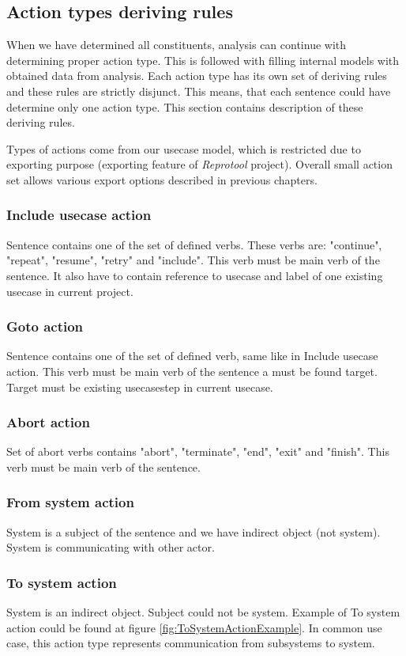 \subsection{Action types deriving rules}
\label{sec:actiontypes}
When we have determined all constituents, analysis can continue with determining proper action type. This is followed with filling internal models with obtained data from analysis. Each action type has its own set of deriving rules and these rules are strictly disjunct. This means, that each sentence could have determine only one action type. This section contains description of these deriving rules. 

Types of actions come from our usecase model, which is restricted due to exporting purpose (exporting feature of \emph{Reprotool} project). Overall small action set allows various export options described in previous chapters. 

\subsubsection{Include usecase action}
Sentence contains one of the set of defined verbs. These verbs are: "continue", "repeat", "resume", "retry" and "include".  This verb must be main verb of the sentence. It also have to contain reference to usecase and label of one existing usecase in current project.

\subsubsection{Goto action}
Sentence contains one of the set of defined verb, same like in Include usecase action. This verb must be main verb of the sentence a must be found target. Target must be existing usecasestep in current usecase. 

\subsubsection{Abort action}
Set of abort verbs contains "abort", "terminate", "end", "exit" and "finish".  This verb must be main verb of the sentence.

\subsubsection{From system action}
System is a subject of the sentence and we have indirect object (not system). System is communicating with other actor.

\subsubsection{To system action}
System is an indirect object. Subject could not be system. Example of To system action could be found at figure \ref{fig:ToSystemActionExample}. In common use case, this action type represents communication from subsystems to system.

